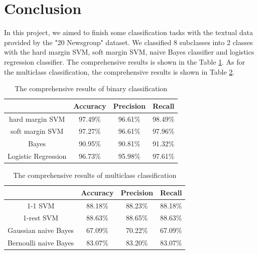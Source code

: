 \documentclass{article}
\begin{document}
\section{Conclusion}
In this project, we aimed to finish some classification tasks with the textual data provided by the "20 Newsgroup" dataset. We classified 8 subclasses into 2 classes with the hard margin SVM, soft margin SVM, naive Bayes classifier and logistics regression classifier. The comprehensive results is shown in the Table \ref{tb:binaryresults}. As for the multiclass classification, the comprehensive results is shown in Table \ref{tb:multiresults}.
\begin{table}
\begin{center}
\caption{The comprehensive results of binary classification}
\label{tb:binaryresults}
\begin{tabular}{|c|c|c|c|}
\hline
& Accuracy& Precision& Recall\\
\hline
hard margin SVM& 97.49\%&96.61\% &98.49\% \\
\hline
soft margin SVM& 97.27\%&96.61\% &97.96\% \\
\hline 	
Bayes&90.95\% &90.81\% & 91.32\%\\
\hline
Logistic Regression& 96.73\%&95.98\% &97.61\%\\
\hline
\end{tabular}
\end{center}
\end{table}

\begin{table}
\begin{center}
\caption{The comprehensive results of multiclass classification}
\label{tb:multiresults}
\begin{tabular}{|c|c|c|c|}
\hline
& Accuracy& Precision& Recall\\
\hline
1-1 SVM& 88.18\%&88.23\% &88.18\% \\
\hline
1-rest SVM& 88.63\%&88.65\%&88.63\%\\
\hline
Gaussian naive Bayes& 67.09\%& 70.22\%& 67.09\%\\
\hline
Bernoulli naive Bayes& 83.07\%&83.20\%& 83.07\%\\
\hline
\end{tabular}
\end{center}
\end{table}
\end{document}
